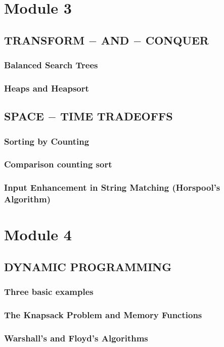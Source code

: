 \documentclass{article}
\begin{document}
	\section{Module 3}
	\subsection{TRANSFORM $-$ AND $-$ CONQUER}
	\subsubsection{Balanced Search Trees}
	\subsubsection{Heaps and Heapsort}

	\subsection{SPACE $-$ TIME TRADEOFFS}
	\subsubsection{Sorting by Counting}
	\subsubsection{Comparison counting sort}
	\subsubsection{Input Enhancement in String Matching (Horspool's Algorithm)}
	\newpage

	\section{Module 4}
	\subsection{DYNAMIC PROGRAMMING}
	\subsubsection{Three basic examples}
	\subsubsection{The Knapsack Problem and Memory Functions}
	\subsubsection{Warshall's and Floyd's Algorithms}
\end{document}
